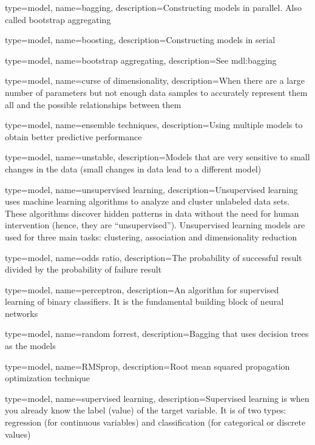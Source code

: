 

{
	type=model,
    name=bagging,
    description={Constructing models in parallel.  Also called bootstrap aggregating}
}

{
	type=model,
    name=boosting,
    description={Constructing models in serial}
}

{
	type=model,
    name=bootstrap aggregating,
    description={See \gls{mdl:bagging}}
}

{
	type=model,
    name=curse of dimensionality,
    description={When there are a large number of parameters but not enough data samples to accurately represent them all and the possible relationships between them}
}

{
	type=model,
    name=ensemble techniques,
    description={Using multiple models to obtain better predictive performance}
}

{
	type=model,
    name=unstable,
    description={Models that are very sensitive to small changes in the data (small changes in data lead to a different model)}
}

{
	type=model,
    name=unsupervised learning,
    description={Unsupervised learning uses machine learning algorithms to analyze and cluster unlabeled data sets. These algorithms discover hidden patterns in data without the need for human intervention (hence, they are ``unsupervised'').  Unsupervised learning models are used for three main tasks: clustering, association and dimensionality reduction}
}

{
	type=model,
    name=odds ratio,
    description={The probability of successful result divided by the probability of failure result}
}

{
	type=model,
    name=perceptron,
    description={An algorithm for supervised learning of binary classifiers.  It is the fundamental building block of neural networks}
}

{
	type=model,
    name=random forrest,
    description={Bagging that uses decision trees as the models}
}

{
	type=model,
    name=RMSprop,
    description={Root mean squared propagation optimization technique}
}

{
	type=model,
    name=supervised learning,
    description={Supervised learning is when you already know the label (value) of the target variable. It is of two types: regression (for continuous variables) and classification (for categorical or discrete values)}
} 